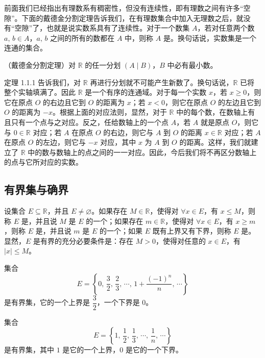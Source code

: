 \documentclass[UTF8,12pt,a4paper,fontset=fandol]{ctexbook}
\begin{document}
前面我们已经指出有理数系有稠密性，但没有连续性，即有理数之间有许多“空隙”。下面的戴德金分割定理告诉我们，在有理数集合中加入无理数之后，就没有“空隙”了，也就是说实数系具有了连续性。对于一个数集 $A$，若对任意两个数 $a,\,b\in A$，$a,\,b$ 之间的所有的数都在 $A$ 中，则称 $A$ 是。换句话说，实数集是一个连通的集合。


\begin{theorem}
（戴德金分割定理）对 $\mathbb{R}$ 的任一分划 $(A\mid B)$，$B$ 中必有最小数。
\end{theorem}


定理 1.1.1 告诉我们，对 $\mathbb{R}$ 再进行分划就不可能产生新数了。换句话说，$\mathbb{R}$ 已将整个实轴填满了。因此 $\mathbb{R}$ 是一个有序的连通域。对于每一个实数 $x$，若 $x\geqslant 0$，则它在原点 $O$ 的右边且它到 $O$ 的距离为 $x$；若 $x<0$，则它在原点 $O$ 的左边且它到 $O$ 的距离为 $-x$。根据上面的对应法则，显然，对于 $\mathbb{R}$ 中的每个数，在数轴上有且只有一个点与之对应。反之，任给数轴上的一个点 $A$，若 $A$ 就是原点 $O$，则它与 $0\in\mathbb{R}$ 对应；若 $A$ 在原点 $O$ 的右边，则它与 $A$ 到 $O$ 的距离 $x\in\mathbb{R}$ 对应；若 $A$ 在原点 $O$ 的左边，则它与 $-x$ 对应，其中 $x$ 为 $A$ 到 $O$ 的距离。这样，我们就建立了 $\mathbb{R}$ 中的数与数轴上的点之间的一一对应。因此，今后我们将不再区分数轴上的点与它所对应的实数。


\subsection{有界集与确界}
设集合 $E\subseteq\mathbb{R}$，并且 $E\ne\varnothing$。如果存在 $M\in\mathbb{R}$，使得对 $\forall x\in E$，有 $x\leqslant M$，则称 $E$ 是，并且说 $M$ 是 $E$ 的一个；如果存在 $m\in\mathbb{R}$，使得对 $\forall x\in E$，有 $x\geqslant m$，则称 $E$ 是，并且说 $m$ 是 $E$ 的一个；如果 $E$ 既有上界又有下界，则称 $E$ 是。显然，$E$ 是有界的充分必要条件是：存在 $M>0$，使得对任意的 $x\in E$，有 $|x|\leqslant M$。


\begin{example}
集合
\[
  E=\left\{0,\,\frac32,\,\frac23,\,\cdots,\,1+\frac{(-1)^n}{n},\,\cdots\right\}
\]
是有界集，它的一个上界是 $\dfrac32$，一个下界是 $0$。
\end{example}


\begin{example}
集合
\[
  E=\left\{1,\,\frac12,\,\frac13,\,\cdots,\,\frac1n,\,\cdots\right\}
\]
是有界集，其中 $1$ 是它的一个上界，$0$ 是它的一个下界。
\end{example}
\end{document}
